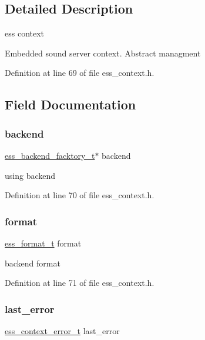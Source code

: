 \subsection{Detailed Description}
ess context 

Embedded sound server context. Abstract managment 

Definition at line 69 of file ess\+\_\+context.\+h.



\subsection{Field Documentation}
\mbox{\label{structess__context_a1fdb06c6d95c1f47d692da94aaf8af17}} 
\subsubsection{\texorpdfstring{backend}{backend}}
{\footnotesize\ttfamily \hyperlink{ess__backend_8h_ab1487f8c501b38b66796d0fbecb7ed7b}{ess\+\_\+backend\+\_\+facktory\+\_\+t}$\ast$ backend}

using backend 

Definition at line 70 of file ess\+\_\+context.\+h.

\mbox{\label{structess__context_abb4395d1c05d3bbc2e1d011507ddd19b}} 
\subsubsection{\texorpdfstring{format}{format}}
{\footnotesize\ttfamily \hyperlink{ess__format_8h_ab03f24cb5d42f4448f713bf1ec178163}{ess\+\_\+format\+\_\+t} format}

backend format 

Definition at line 71 of file ess\+\_\+context.\+h.

\mbox{\label{structess__context_a7a8b9bb3789092b56f6a6623888fcc3d}} 
\subsubsection{\texorpdfstring{last\+\_\+error}{last\_error}}
{\footnotesize\ttfamily \hyperlink{ess__context_8h_acc807999e4f53d1867abf8a0ac682f33}{ess\+\_\+context\+\_\+error\+\_\+t} last\+\_\+error}

